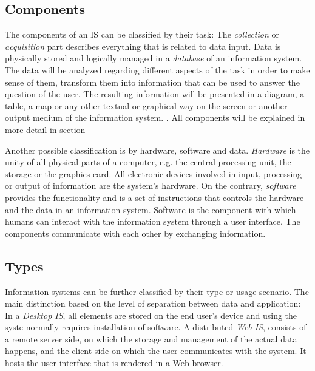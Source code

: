 \subsection{Components} %
\label{sub:components_is}


The components of an IS can be classified by their task: The \emph{collection} or \emph{acquisition} part describes everything that is related to data input. Data is physically stored and logically managed in a \emph{database} of an information system. The data will be analyzed regarding different aspects of the task in order to make sense of them, transform them into information that can be used to answer the question of the user. The resulting information will be presented in a diagram, a table, a map or any other textual or graphical way on the screen or another output medium of the information system.
\cite{informationSystem}.
All components will be explained in more detail in section %

Another possible classification is by hardware, software and data. \emph{Hardware} is the unity of all physical parts of a computer, e.g. the central processing unit, the storage or the graphics card. All electronic devices involved in input, processing or output of information are the system's hardware. On the contrary, \emph{software} provides the functionality and is a set of instructions that controls the hardware and the data in an information system. Software is the component with which humans can interact with the information system through a user interface. The components communicate with each other by exchanging information.



\subsection{Types} %
\label{sub:types}

Information systems can be further classified by their type or usage scenario. The main distinction based on the level of separation between data and application: In a \emph{Desktop IS}, all elements are stored on the end user's device and using the syste normally requires installation of software. A distributed \emph{Web IS}, consists of a remote server side, on which the storage and management of the actual data happens, and the client side on which the user communicates with the system. It hosts the user interface that is rendered in a Web browser.

